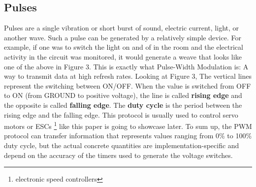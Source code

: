 \documentclass{IEEEtran}
\begin{document}
\subsection*{Pulses}
Pulses are a single vibration or short burst of sound, electric current, light, or another wave. Such a pulse can be generated by a relatively simple device. For example, if one was to switch the light on and of in the room and the electrical activity in the circuit was monitored, it would generate a weave that looks like one of the above in Figure 3. 
\newline
\newline
This is exactly what Pulse-Width Modulation is: A way to transmit data at high refresh rates. Looking at Figure 3, The vertical lines represent the switching between ON/OFF. When the value is switched from OFF to ON (from GROUND to positive voltage), the line is called \textbf{rising edge} and the opposite is called \textbf{falling edge}. The \textbf{duty cycle} is the period between the rising edge and the falling edge.
\newline
This protocol is usually used to control servo motors or ESCs \footnote{electronic speed controllers} like this paper is going to showcase later.
\newline
\newline
To sum up, the PWM protocol can transfer information that represents values ranging from 0\% to 100\% duty cycle, but the actual concrete quantities are implementation-specific and depend on the accuracy of the timers used to generate the voltage switches.
\end{document}
